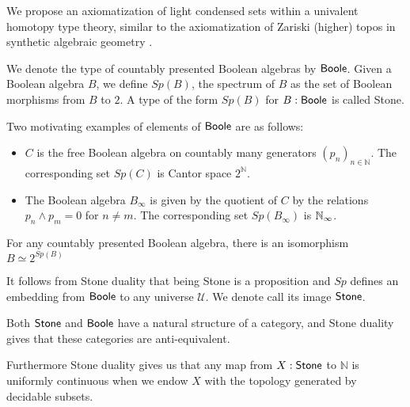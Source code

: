 We propose an axiomatization of light condensed sets \cite{Scholze}
within a univalent homotopy type theory, 
similar to the axiomatization of Zariski (higher) topos in synthetic algebraic geometry 
\cite{draft}. 

\medskip

We denote the type of countably presented Boolean algebras by $\mathsf{Boole}$.
Given a Boolean algebra $B$, we define $Sp(B)$, the spectrum of $B$ as the set of 
Boolean morphisms from $B$ to $2$. 
 A type of the form $Sp(B)$ for $B:\mathsf{Boole}$ is called Stone.


 Two motivating examples of elements of $\mathsf{Boole}$ are as follows:
 \begin{itemize}
   \item $C$ is the free Boolean algebra on countably many generators $(p_n)_{n\in\mathbb N}$. 
     The corresponding set $Sp(C)$ is Cantor space $2^\mathbb N$. 
   \item The Boolean algebra $ B_\infty$ is given by the quotient of $C$ by the relations $p_n\wedge p_m = 0$ for $n\neq m$. 
 The corresponding set $Sp(B_\infty)$ is $\mathbb{N}_{\infty}$. 
  \end{itemize} 

\begin{axiom}
  For any countably presented Boolean algebra, there is an isomorphism $B \simeq 2^{Sp(B)}$
\end{axiom}
It follows from Stone duality that being Stone is a proposition and $Sp$ defines an embedding from $\mathsf{Boole}$ 
to any universe $\mathcal U$. We denote call its image $\mathsf{Stone}$. 

Both $\mathsf{Stone}$ and $\mathsf{Boole}$ have a natural structure of a category, and 
Stone duality gives that these categories are anti-equivalent. 

Furthermore Stone duality gives us that any map from $X:\mathsf{Stone}$ to $\mathbb N$ is uniformly continuous
when we endow $X$ with the topology generated by decidable subsets. 

